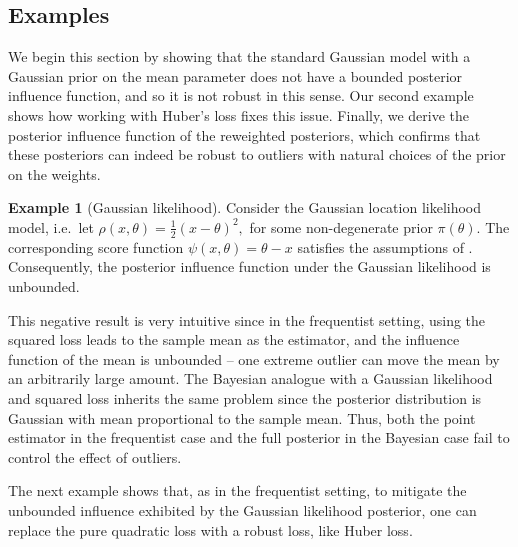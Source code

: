 \documentclass[11pt, oneside]{amsart}
\theoremstyle{definition}   %
\newtheorem{example}{Example}
\newcommand{\score}{\psi}
\begin{document}
\subsection{Examples}
%
We begin this section by showing that the standard Gaussian model with a Gaussian prior on the mean parameter does not have a bounded posterior influence function, and so it is not robust in this sense. Our second example shows how working with Huber's loss fixes this issue. Finally, we derive the posterior influence function of the reweighted posteriors, which confirms that these posteriors can indeed be robust to outliers with natural choices of the prior on the weights.
%

\begin{example}[Gaussian likelihood]
\label{example::influence-function-gaussian}
%
Consider the Gaussian location likelihood model, i.e.\ let
%
\(
    \rho(x, \theta) = \tfrac{1}{2}(x-\theta )^2,
\)
%
for some non-degenerate prior \( \pi(\theta) \).  The corresponding score function \( \score(x, \theta) = \theta - x \) satisfies the assumptions of .  Consequently, the posterior influence function under the Gaussian likelihood is unbounded.

This negative result is very intuitive since in the frequentist setting, using the squared loss leads to the sample mean as the estimator, and the influence function of the mean is unbounded -- one extreme outlier can move the mean by an arbitrarily large amount. The Bayesian analogue with a Gaussian likelihood and squared loss inherits the same problem since the posterior distribution is Gaussian with mean proportional to the sample mean. Thus, both the point estimator in the frequentist case and the full posterior in the Bayesian case fail to control the effect of outliers. 

\end{example}

The next example shows that, as in the frequentist setting, to mitigate the unbounded influence exhibited by the Gaussian likelihood posterior, one can replace the pure quadratic loss with a robust loss, like Huber loss.
\end{document}
